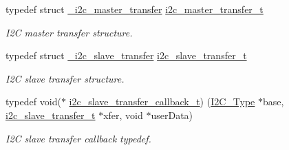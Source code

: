 \begin{DoxyCompactItemize}
\mbox{\label{group__i2c__driver_ga0e25c3c153992361c8d359a86b70d3c6}} 
typedef struct \mbox{\hyperlink{struct__i2c__master__transfer}{\+\_\+i2c\+\_\+master\+\_\+transfer}} \mbox{\hyperlink{group__i2c__driver_ga0e25c3c153992361c8d359a86b70d3c6}{i2c\+\_\+master\+\_\+transfer\+\_\+t}}
\begin{DoxyCompactList}\small\item\em I2C master transfer structure. \end{DoxyCompactList}\item 
\mbox{\label{group__i2c__driver_ga69e696cb21165bc58176475879a471cf}} 
typedef struct \mbox{\hyperlink{struct__i2c__slave__transfer}{\+\_\+i2c\+\_\+slave\+\_\+transfer}} \mbox{\hyperlink{group__i2c__driver_ga69e696cb21165bc58176475879a471cf}{i2c\+\_\+slave\+\_\+transfer\+\_\+t}}
\begin{DoxyCompactList}\small\item\em I2C slave transfer structure. \end{DoxyCompactList}\item 
\mbox{\label{group__i2c__driver_ga2583e3d8ebf8d3de410d8b6263238c35}} 
typedef void($\ast$ \mbox{\hyperlink{group__i2c__driver_ga2583e3d8ebf8d3de410d8b6263238c35}{i2c\+\_\+slave\+\_\+transfer\+\_\+callback\+\_\+t}}) (\mbox{\hyperlink{struct_i2_c___type}{I2\+C\+\_\+\+Type}} $\ast$base, \mbox{\hyperlink{group__i2c__driver_ga69e696cb21165bc58176475879a471cf}{i2c\+\_\+slave\+\_\+transfer\+\_\+t}} $\ast$xfer, void $\ast$user\+Data)
\begin{DoxyCompactList}\small\item\em I2C slave transfer callback typedef. \end{DoxyCompactList}\end{DoxyCompactItemize}
